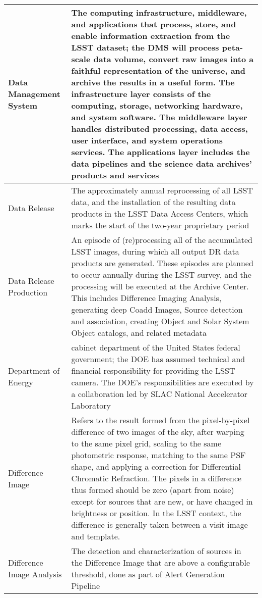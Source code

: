 \begin{longtable}{|p{}|p{}|}
Data Management System & The computing infrastructure, middleware, and applications that process, store, and enable information extraction from the \gls{LSST} dataset; the \gls{DMS} will process peta-scale data volume, convert raw images into a faithful representation of the universe, and archive the results in a useful form. The infrastructure layer consists of the computing, storage, networking hardware, and system software. The middleware layer handles distributed processing, data access, user interface, and system operations services. The applications layer includes the data pipelines and the science data archives' products and services \\\hline
Data Release & The approximately annual reprocessing of all \gls{LSST} data, and the installation of the resulting data products in the \gls{LSST} Data Access Centers, which marks the start of the two-year proprietary period \\\hline
Data Release Production & An episode of (re)processing all of the accumulated \gls{LSST} images, during which all output \gls{DR} data products are generated. These episodes are planned to occur annually during the \gls{LSST} survey, and the processing will be executed at the \gls{Archive} \gls{Center}. This includes Difference Imaging Analysis, generating deep Coadd Images, \gls{Source} detection and association, creating Object and \gls{Solar System Object} catalogs, and related \gls{metadata} \\\hline
Department of Energy & cabinet department of the United States federal government; the \gls{DOE} has assumed technical and financial responsibility for providing the \gls{LSST} \gls{camera}. The \gls{DOE}'s responsibilities are executed by a collaboration led by \gls{SLAC} National Accelerator Laboratory \\\hline
Difference Image & Refers to the result formed from the pixel-by-pixel difference of two images of the sky, after warping to the same pixel grid, scaling to the same photometric response, matching to the same \gls{PSF} \gls{shape}, and applying a correction for \gls{Differential Chromatic Refraction}. The pixels in a difference thus formed should be zero (apart from noise) except for sources that are new, or have changed in brightness or position. In the \gls{LSST} context, the difference is generally taken between a visit image and template.  \\\hline
Difference Image Analysis & The detection and characterization of sources in the \gls{Difference Image} that are above a configurable threshold, done as part of \gls{Alert} Generation Pipeline \\\hline

\end{longtable}
